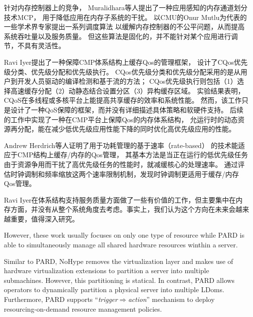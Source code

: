 
针对内存控制器上的竞争，
Muralidhara等人提出了一种应用感知的内存通道划分技术MCP\cite{muralidhara_reducing_2011}，
用于降低应用在内存子系统的干扰。
以CMU的Onur Mutlu为代表的一些学术界专家提出一系列调度算法\cite{mutlu_stall-time_2007, mutlu_parallelism-aware_2008, kim_atlas:_2010, kim_thread_2010}
以缓解内存控制器的不公平问题，从而提高系统吞吐量以及服务质量。
但这些算法是固化的，并不能针对某个应用进行调节，不具有灵活性。

Ravi Iyer提出了一种保障CMP体系结构上缓存Qos的管理框架\cite{iyer_cqos:_2004}，
设计了CQos优先级分类、优先级分配和优先级执行。
CQos优先级分类和优先级分配采用的是从用户到开发人员驱动的编译检测和基于流的方法；
CQos优先级执行则包括（1）选择高速缓存分配（2）动静态结合设置分区（3）异构缓存区域。
实验结果表明， CQoS在多线程或多核平台上能提高共享缓存的效率和系统性能。
然而，该工作只是设计了一种QoS保障的框架，而并没有详细描述具体策略和软硬件支持。
后续的工作\cite{iyer_qos_2007, li_dynamic_2012}中实现了一种在CMP平台上保障Qos的内存体系结构，
允运行时的动态资源再分配，能在减少低优先级应用性能下降的同时优化高优先级应用的性能。

Andrew Herdrich等人\cite{herdrich_rate-based_2009}证明了用于功耗管理的基于速率（rate-based）
的技术能适应于CMP结构上缓存/内存的Qos管理，
其基本方法是当正在运行的低优先级任务由于资源争用而干扰了高优先级任务的性能时，就减缓核心的处理速率。
通过评估时钟调制和频率缩放这两个速率限制机制，发现时钟调制更适用于缓存/内存Qos管理。

Ravi Iyer在体系结构支持服务质量方面做了一些有价值的工作，但主要集中在内存方面，并没有从整个系统角度去考虑。事实上，我们认为这个方向在未来会越来越重要，值得深入研究。



However, these work usually focuses on only one type of resource while
PARD is able to simultaneously manage all shared hardware resources winthin a server.

Similar to PARD, NoHype \cite{keller_nohype:_2010} removes the virtualization layer
and makes use of hardware virtualization extensions to partition a server into multiple
submachines. However, this partitioning is statical.
In contrast, PARD allows operators to dynamically partition a physical server into
multiple LDoms. Furthermore, PARD supports ``\emph{trigger$\Rightarrow$action}''
mechanism to deploy resourcing-on-demand resource management policies.



